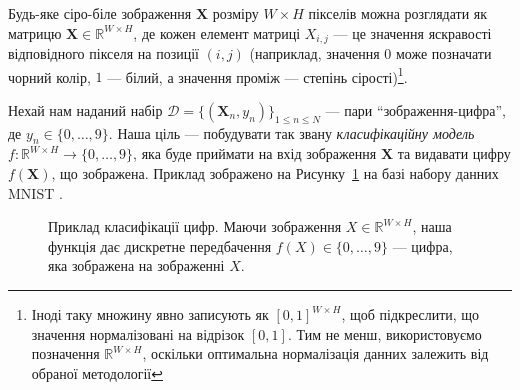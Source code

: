 \begin{example}
	Будь-яке сіро-біле зображення $\boldsymbol{X}$ розміру $W \times H$ пікселів
	можна розглядати як матрицю $\boldsymbol{X} \in \mathbb{R}^{W \times H}$, де
	кожен елемент матриці $X_{i,j}$ --- це значення яскравості відповідного
	пікселя на позиції $(i,j)$ (наприклад, значення $0$ може позначати чорний
	колір, $1$ --- білий, а значення проміж --- степінь сірості)\footnote{Іноді
	таку множину явно записують як $[0,1]^{W \times H}$, щоб підкреслити, що
	значення нормалізовані на відрізок $[0,1]$. Тим не менш, використовуємо
	позначення $\mathbb{R}^{W \times H}$, оскільки оптимальна нормалізація
	данних залежить від обраної методології}. 
	
	Нехай нам наданий набір $\mathcal{D} =
	\{(\boldsymbol{X}_n,y_n)\}_{1 \leq n \leq N}$ --- пари
	``зображення-цифра'', де $y_n \in \{0,\dots,9\}$. Наша ціль ---
	побудувати так звану \textit{класифікаційну модель} $f: \mathbb{R}^{W \times
	H} \to \{0,\dots,9\}$, яка буде приймати на вхід зображення
	$\boldsymbol{X}$ та видавати цифру $f(\boldsymbol{X})$, що зображена.
	Приклад зображено на Рисунку~\ref{fig:digits} на базі набору данних MNIST
	\cite{mnist}.

	\begin{figure}
		\centering
		\caption{Приклад класифікації цифр. Маючи зображення $X \in \mathbb{R}^{W \times H}$, наша функція дає дискретне передбачення $f(X) \in \{0,\dots,9\}$ --- цифра, яка зображена на зображенні $X$.}
		\label{fig:digits}
	\end{figure}

\end{example}

